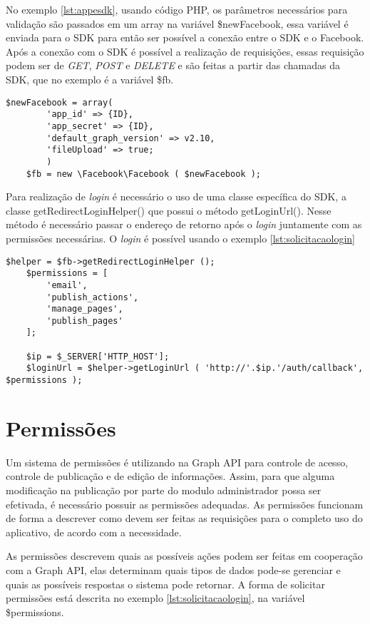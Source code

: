 No exemplo \ref{lst:appesdk}, usando código PHP, os parâmetros necessários para validação são passados em um array na variável \$newFacebook, essa variável é enviada para o SDK para então ser possível a conexão entre o SDK e o Facebook. Após a conexão com o SDK é possível a realização de requisições, essas requisição podem ser de \textit{GET}, \textit{POST} e \textit{DELETE} e são feitas a partir das chamadas da SDK, que no exemplo é a variável \$fb.

\begin{lstlisting}[caption={Conexão entre aplicativo e SDK},label={lst:appesdk}]
	$newFacebook = array(
		'app_id' => {ID},
		'app_secret' => {ID},
		'default_graph_version' => v2.10,
		'fileUpload' => true;
		)
	$fb = new \Facebook\Facebook ( $newFacebook );
\end{lstlisting}

Para realização de \textit{login} é necessário o uso de uma classe específica do SDK, a classe getRedirectLoginHelper() que possui o método getLoginUrl(). Nesse método é necessário passar o endereço de retorno após o \textit{login} juntamente com as permissões necessárias. O \textit{login} é possível usando o exemplo \ref{lst:solicitacaologin}

\begin{lstlisting}[caption={Solicitação de Login},label={lst:solicitacaologin}]
	$helper = $fb->getRedirectLoginHelper ();
	$permissions = [
		'email',
		'publish_actions',
		'manage_pages',
		'publish_pages'
	];

	$ip = $_SERVER['HTTP_HOST'];
	$loginUrl = $helper->getLoginUrl ( 'http://'.$ip.'/auth/callback', $permissions );
\end{lstlisting}


\section{Permissões}
Um sistema de permissões é utilizando na Graph API para controle de acesso, controle de publicação e de edição de informações. Assim, para que alguma modificação na publicação por parte do modulo administrador possa ser efetivada, é necessário possuir as permissões adequadas. As permissões funcionam de forma a descrever como devem ser feitas as requisições para o completo uso do aplicativo, de acordo com a necessidade.

As permissões descrevem quais as possíveis ações podem ser feitas em cooperação com a Graph API, elas determinam quais tipos de dados pode-se gerenciar e quais as possíveis respostas o sistema pode retornar. A forma de solicitar permissões está descrita no exemplo \ref{lst:solicitacaologin}, na variável \$permissions.

